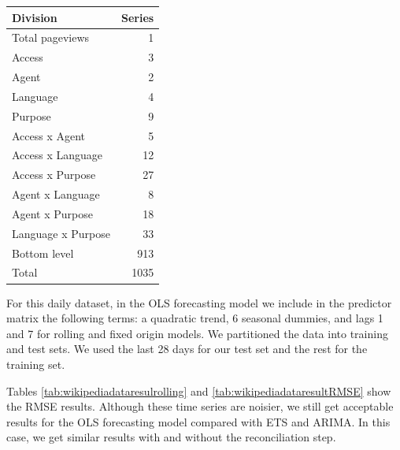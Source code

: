\documentclass[11pt,a4paper,]{article}
\let\origtable\table
\let\endorigtable\endtable
\renewenvironment{table}[1][2] {
    \expandafter\origtable\expandafter[!htbp]
} {
    \endorigtable
}
\begin{document}
\begin{table}[!h]

\caption{\label{tab:wikidivision}Number of Wikipedia pageviews series at each aggregation level.}
\centering
\begin{tabular}[t]{lr}
\toprule
Division & Series\\
\midrule
Total pageviews & 1\\
Access & 3\\
Agent & 2\\
Language & 4\\
Purpose & 9\\
Access x Agent & 5\\
Access x Language & 12\\
Access x Purpose & 27\\
Agent x Language & 8\\
Agent x Purpose & 18\\
Language x Purpose & 33\\
Bottom level & 913\\
\hline
Total & 1035\\
\bottomrule
\end{tabular}
\end{table}

For this daily dataset, in the OLS forecasting model we include in the predictor matrix the following terms: a quadratic trend, 6 seasonal dummies, and lags 1 and 7 for rolling and fixed origin models. We partitioned the data into training and test sets. We used the last 28 days for our test set and the rest for the training set.

Tables \ref{tab:wikipediadataresulrolling} and \ref{tab:wikipediadataresultRMSE} show the RMSE results. Although these time series are noisier, we still get acceptable results for the OLS forecasting model compared with ETS and ARIMA. In this case, we get similar results with and without the reconciliation step.
\end{document}
